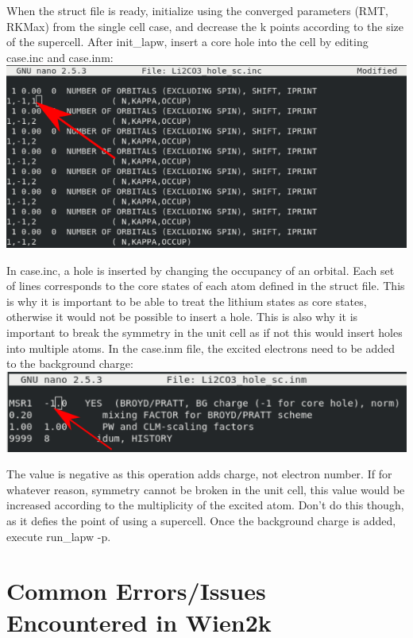 \documentclass[12pt]{article}
\begin{document}
When the struct file is ready, initialize using the converged parameters (RMT, RKMax) from the single cell case, and decrease the k points according to the size of the supercell.  After init\_lapw, insert a core hole into the cell by editing case.inc and case.inm: \\

\includegraphics[scale=0.5]{./images/hole_inc.png}

In case.inc, a hole is inserted by changing the occupancy of an orbital.  Each set of lines corresponds to the core states of each atom defined in the struct file.  This is why it is important to be able to treat the lithium states as core states, otherwise it would not be possible to insert a hole.  This is also why it is important to break the symmetry in the unit cell as if not this would insert holes into multiple atoms. In the case.inm file, the excited electrons need to be added to the background charge: \\

\includegraphics[scale=0.5]{./images/hole_inm.png}

The value is negative as this operation adds charge, not electron number.  If for whatever reason, symmetry cannot be broken in the unit cell, this value would be increased according to the multiplicity of the excited atom.  Don't do this though, as it defies the point of using a supercell.   Once the background charge is added, execute run\_lapw -p.  





\section{Common Errors/Issues Encountered in Wien2k}
\end{document}
